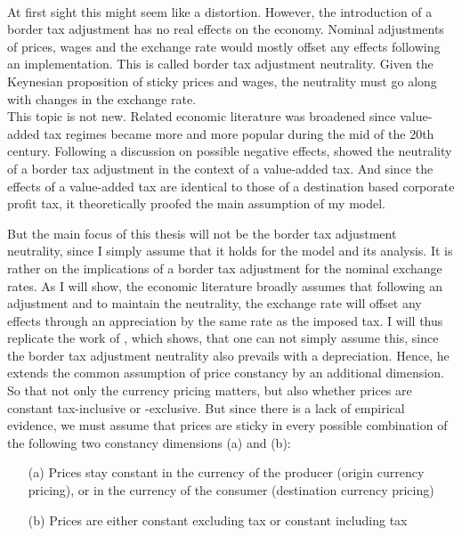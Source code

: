 ~\\ 
At first sight this might seem like a distortion. However, the introduction of a border tax adjustment has no real effects on the economy. Nominal adjustments of prices, wages and the exchange rate would mostly offset any effects following an implementation. This is called border tax adjustment neutrality. Given the Keynesian proposition of sticky prices and wages, the neutrality must go along with changes in the exchange rate.\\
This topic is not new. Related economic literature was broadened since value-added tax regimes became more and more popular during the mid of the 20th century. Following a discussion on possible negative effects, \cite{Feldstein&Krugman} showed the neutrality of a border tax adjustment in the context of a value-added tax. And since the effects of a value-added tax are identical to those of a destination based corporate profit tax, it theoretically proofed the main assumption of my model. 

But the main focus of this thesis will not be the border tax adjustment neutrality, since I simply assume that it holds for the model and its analysis. It is rather on the implications of a border tax adjustment for the nominal exchange rates. As I will show, the economic literature broadly assumes that following an adjustment and to maintain the neutrality, the exchange rate will offset any effects through an appreciation by the same rate as the imposed tax. I will thus replicate the work of \cite{buiter2017exchange}, which shows, that one can not simply assume this, since the border tax adjustment neutrality also prevails with a depreciation. Hence, he extends the common assumption of price constancy by an additional dimension. So that not only the currency pricing matters, but also whether prices are constant tax-inclusive or -exclusive. But since there is a lack of empirical evidence, we must assume that prices are sticky in every possible combination of the following two constancy dimensions (a) and (b):

\begin{itemize}
\item[(a)] \label{const1} Prices stay constant in the currency of the producer (origin currency pricing), or in the currency of the consumer (destination currency pricing)
\item[(b)] \label{const2} Prices are either constant excluding tax or constant including tax 
\end{itemize}\\


